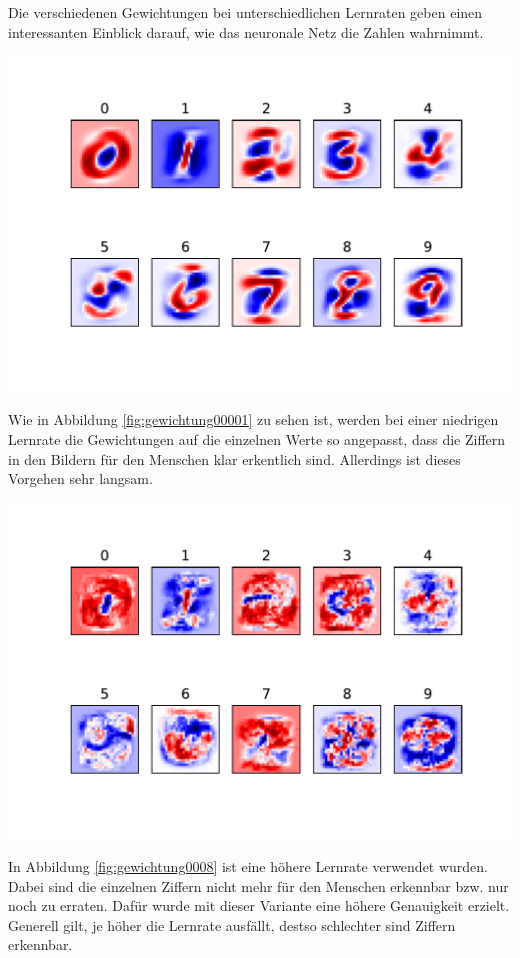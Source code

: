 Die verschiedenen Gewichtungen bei unterschiedlichen Lernraten geben einen interessanten Einblick darauf, wie das neuronale Netz die Zahlen wahrnimmt.
\begin{center}
	\includegraphics[width=.6\textwidth]{../abbildungen/weightPlot00001.pdf}
	\label{fig:gewichtung00001}
\end{center}

Wie in Abbildung \ref{fig:gewichtung00001} zu sehen ist, werden bei einer niedrigen Lernrate die Gewichtungen auf die einzelnen Werte so angepasst, dass die Ziffern in den Bildern für den Menschen klar erkentlich sind. Allerdings ist dieses Vorgehen sehr langsam.

\begin{center}
	\includegraphics[width=.6\textwidth]{../abbildungen/weightPlot0008.pdf}
	\label{fig:gewichtung0008}
\end{center}

In Abbildung \ref{fig:gewichtung0008} ist eine höhere Lernrate verwendet wurden. Dabei sind die einzelnen Ziffern nicht mehr für den Menschen erkennbar bzw. nur noch zu erraten. Dafür wurde mit dieser Variante eine höhere Genauigkeit erzielt. Generell gilt, je höher die Lernrate ausfällt, destso schlechter sind Ziffern erkennbar.

